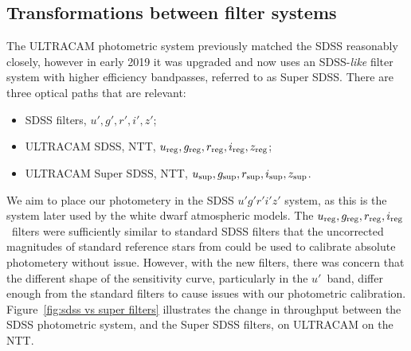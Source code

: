 \subsection{Transformations between filter systems}
\label{sect:colour correction method}

The ULTRACAM photometric system previously matched the SDSS reasonably closely, however in early 2019 it was upgraded and now uses an SDSS-\emph{like} filter system with higher efficiency bandpasses, referred to as Super SDSS. There are three optical paths that are relevant:
\begin{itemize}
\item SDSS filters, $u', g', r', i', z'$;
\item ULTRACAM SDSS, NTT, $u_{\rm reg}, g_{\rm reg}, r_{\rm reg}, i_{\rm reg}, z_{\rm reg}$;
\item ULTRACAM Super SDSS,  NTT, $u_{\rm sup}, g_{\rm sup}, r_{\rm sup}, i_{\rm sup}, z_{\rm sup}$.
\end{itemize}

We aim to place our photometery in the SDSS $u'g'r'i'z'$ system, as this is the system later used by the white dwarf atmospheric models. The $u_{\rm reg}, g_{\rm reg}, r_{\rm reg}, i_{\rm reg}$\ filters were sufficiently similar to standard SDSS filters that the uncorrected magnitudes of standard reference stars from \citet{smith2002} could be used to calibrate absolute photometery without issue. However, with the new filters, there was concern that the different shape of the sensitivity curve, particularly in the $u'$\ band, differ enough from the standard filters to cause issues with our photometric calibration. Figure~\ref{fig:sdss vs super filters} illustrates the change in throughput between the SDSS photometric system, and the Super SDSS filters, on ULTRACAM on the NTT. 

